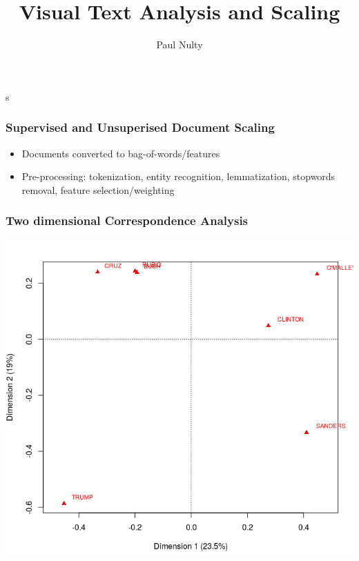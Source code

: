 \documentclass[11pt, table, dvipsnames]{beamer}
\title[Visual Text Analysis Hackathon]{Visual Text Analysis and Scaling }
\author{Paul Nulty}
\begin{document}
\begin{frame}%
\titlepage
s\end{frame}

\begin{frame}
	\frametitle{Supervised and Unsuperised Document Scaling}
	\begin{itemize}
		\item Documents converted to bag-of-words/features
		\item Pre-processing: tokenization, entity recognition, lemmatization, stopwords removal, feature selection/weighting
	\end{itemize}
\end{frame}

\begin{frame}
  \frametitle{Two dimensional Correspondence Analysis}
  \includegraphics[scale=0.35]{2DCA}\\
\end{frame}
\end{document}
